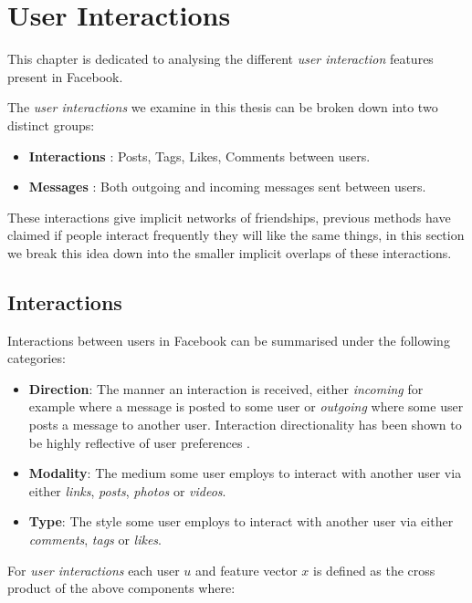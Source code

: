 
\chapter{User Interactions}
\label{cha:interactions}

This chapter is dedicated to analysing the different \emph{user interaction} features present in Facebook.

The \emph{user interactions} we examine in this thesis can be broken down into two distinct groups:
\begin{itemize}
\item \textbf{Interactions} : Posts, Tags, Likes, Comments between users.
\item \textbf{Messages} : Both outgoing and incoming messages sent between users.
\end{itemize}

These interactions give implicit networks of friendships, previous methods \cite{www} have claimed if people interact frequently 
they will like the same things, in this section we break this idea down into the smaller implicit overlaps of these interactions.

\section{Interactions}
\label{sec:inter}

Interactions between users in Facebook can be summarised under the following categories:

\begin{itemize}
\item \textbf{Direction}: The manner an interaction is received, either \emph{incoming} for example where a message is posted to some user or 
\emph{outgoing} where some user posts a message to another user. Interaction directionality has been shown to be highly 
reflective of user preferences \cite{saez2011high}.
\item \textbf{Modality}: The medium some user employs to interact with another user via either \emph{links}, \emph{posts}, \emph{photos} or \emph{videos}.
\item \textbf{Type}: The style some user employs to interact with another user via either \emph{comments}, \emph{tags} or \emph{likes}.
\end{itemize}

For \emph{user interactions} each user $u$ and feature vector $x$ is defined as the cross product of the above components where:

